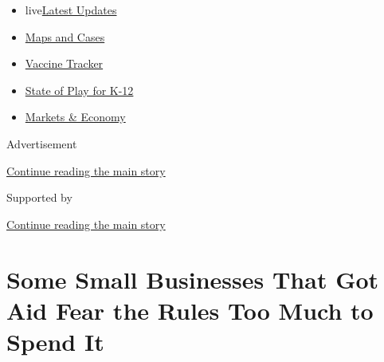 \begin{itemize}
\tightlist
\item
  live\href{https://www.nytimes3xbfgragh.onion/2020/08/17/world/coronavirus-covid.html?name=styln-coronavirus-markets\&region=TOP_BANNER\&variant=undefined\&block=storyline_menu_recirc\&action=click\&pgtype=Article\&impression_id=baaa8821-e0fc-11ea-978b-55c0413dede3}{Latest
  Updates}
\item
  \href{https://www.nytimes3xbfgragh.onion/interactive/2020/us/coronavirus-us-cases.html?name=styln-coronavirus-markets\&region=TOP_BANNER\&variant=undefined\&block=storyline_menu_recirc\&action=click\&pgtype=Article\&impression_id=baaa8822-e0fc-11ea-978b-55c0413dede3}{Maps
  and Cases}
\item
  \href{https://www.nytimes3xbfgragh.onion/interactive/2020/science/coronavirus-vaccine-tracker.html?name=styln-coronavirus-markets\&region=TOP_BANNER\&variant=undefined\&block=storyline_menu_recirc\&action=click\&pgtype=Article\&impression_id=baaa8823-e0fc-11ea-978b-55c0413dede3}{Vaccine
  Tracker}
\item
  \href{https://www.nytimes3xbfgragh.onion/2020/08/17/us/k-12-schools-reopening.html?name=styln-coronavirus-markets\&region=TOP_BANNER\&variant=undefined\&block=storyline_menu_recirc\&action=click\&pgtype=Article\&impression_id=baaaaf30-e0fc-11ea-978b-55c0413dede3}{State
  of Play for K-12}
\item
  \href{https://www.nytimes3xbfgragh.onion/live/2020/08/17/business/stock-market-today-coronavirus?name=styln-coronavirus-markets\&region=TOP_BANNER\&variant=undefined\&block=storyline_menu_recirc\&action=click\&pgtype=Article\&impression_id=baaaaf31-e0fc-11ea-978b-55c0413dede3}{Markets
  \& Economy}
\end{itemize}

Advertisement

\protect\hyperlink{after-top}{Continue reading the main story}

Supported by

\protect\hyperlink{after-sponsor}{Continue reading the main story}

\hypertarget{some-small-businesses-that-got-aid-fear-the-rules-too-much-to-spend-it}{%
\section{Some Small Businesses That Got Aid Fear the Rules Too Much to
Spend
It}\label{some-small-businesses-that-got-aid-fear-the-rules-too-much-to-spend-it}}

